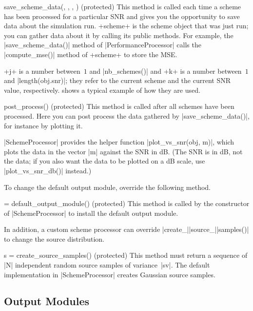\begin{method}{save_scheme_data(\obj, , , )
  (protected)}
  This method is called each time a scheme has been processed for a particular
  SNR and gives you the opportunity to save data about the simulation run.
  +scheme+ is the scheme object that was just run; you can gather data about it
  by calling its public methods. For example, the |save_scheme_data()| method
  of |PerformanceProcessor| calls the |compute_mse()| method of +scheme+ to
  store the MSE.

  +j+ is a number between~$1$ and |nb_schemes()| and +k+ is a number between~$1$
  and |length(obj.snr)|; they refer to the current scheme and the current SNR
  value, respectively.  shows a typical example of how they are
  used.
\end{method}

\begin{method}{post_process(\obj) (protected)}
  This method is called after all schemes have been processed. Here you can post
  process the data gathered by |save_scheme_data()|, for instance by plotting
  it.

  |SchemeProcessor| provides the helper function |plot_vs_snr(obj, m)|, which
  plots the data in the vector |m| against the SNR in dB. (The SNR is in dB, not
  the data; if you also want the data to be plotted on a dB scale, use
  |plot_vs_snr_db()| instead.)
\end{method}

To change the default output module, override the following method.
\begin{method}{ = default_output_module(\obj) (protected)}
  This method is called by the constructor of |SchemeProcessor| to install the
  default output module. 
\end{method}

In addition, a custom scheme processor can override
|create_|\-|source_|\-|samples()| to change the source distribution.

\begin{method}{s = create_source_samples(\obj) (protected)}
  This method must return a sequence of |N| independent random source samples of
  variance~|sv|. The default implementation in |SchemeProcessor| creates
  Gaussian source samples.
\end{method}


\subsection{Output Modules}\label{sec:outputmodules}

